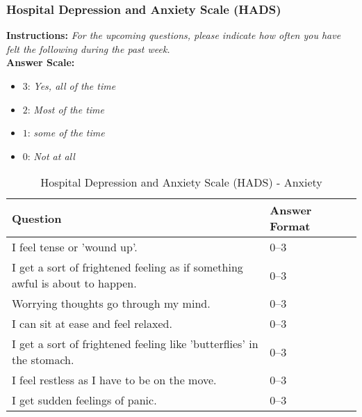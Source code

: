 \subsubsection{Hospital Depression and Anxiety Scale (HADS)}\label{sec:hads}
\textbf{Instructions:} \emph{For the upcoming questions, please indicate how often you have felt the following during the past week.}
\\
\textbf{Answer Scale:}
\begin{itemize}
    \item $3$: \emph{Yes, all of the time}
    \item $2$: \emph{Most of the time}
    \item $1$: \emph{some of the time}
    \item $0$: \emph{Not at all}
\end{itemize}
\begin{table}[H]
    \centering
    \renewcommand{\arraystretch}{1.2}
    \begin{tabularx}{\textwidth}{|l|X|l|}
        \hline
        \textbf{Question} & \textbf{Answer Format} \\ \hline
        I feel tense or 'wound up'. & 0--3 \\ \hline
        I get a sort of frightened feeling as if something awful is about to happen. & 0--3 \\ \hline
        Worrying thoughts go through my mind. & 0--3 \\ \hline
        I can sit at ease and feel relaxed. & 0--3 \\ \hline
        I get a sort of frightened feeling like 'butterflies' in the stomach. & 0--3 \\ \hline
        I feel restless as I have to be on the move. & 0--3 \\ \hline
        I get sudden feelings of panic. & 0--3 \\ \hline
    \end{tabularx}
    \caption{Hospital Depression and Anxiety Scale (HADS) - Anxiety}
    \label{tab:hads-anxiety}
\end{table}

